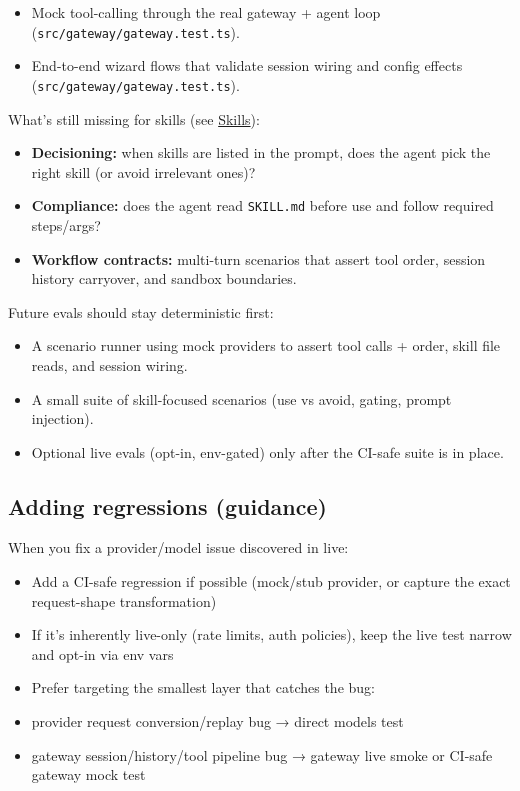 \begin{itemize}
  \item Mock tool-calling through the real gateway + agent loop (\texttt{src/gateway/gateway.test.ts}).
  \item End-to-end wizard flows that validate session wiring and config effects (\texttt{src/gateway/gateway.test.ts}).
\end{itemize}


What’s still missing for skills (see \href{/tools/skills}{Skills}):

\begin{itemize}
  \item \textbf{Decisioning:} when skills are listed in the prompt, does the agent pick the right skill (or avoid irrelevant ones)?
  \item \textbf{Compliance:} does the agent read \texttt{SKILL.md} before use and follow required steps/args?
  \item \textbf{Workflow contracts:} multi-turn scenarios that assert tool order, session history carryover, and sandbox boundaries.
\end{itemize}


Future evals should stay deterministic first:

\begin{itemize}
  \item A scenario runner using mock providers to assert tool calls + order, skill file reads, and session wiring.
  \item A small suite of skill-focused scenarios (use vs avoid, gating, prompt injection).
  \item Optional live evals (opt-in, env-gated) only after the CI-safe suite is in place.
\end{itemize}


\subsection{Adding regressions (guidance)}


When you fix a provider/model issue discovered in live:

\begin{itemize}
  \item Add a CI-safe regression if possible (mock/stub provider, or capture the exact request-shape transformation)
  \item If it’s inherently live-only (rate limits, auth policies), keep the live test narrow and opt-in via env vars
  \item Prefer targeting the smallest layer that catches the bug:
  \item provider request conversion/replay bug → direct models test
  \item gateway session/history/tool pipeline bug → gateway live smoke or CI-safe gateway mock test
\end{itemize}




